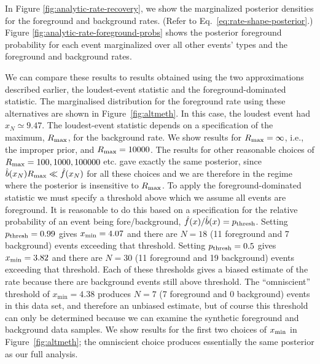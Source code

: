 \documentclass[aps,prd]{revtex4-1}
\begin{document}
In Figure \ref{fig:analytic-rate-recovery}, we show the marginalized
posterior densities for the foreground and background rates.  (Refer
to Eq.~\eqref{eq:rate-shape-posterior}.)  Figure
\ref{fig:analytic-rate-foreground-probs} shows the posterior
foreground probability for each event marginalized over all other
events' types and the foreground and background rates.

We can compare these results to results obtained using the two
approximations described earlier, the loudest-event statistic and the
foreground-dominated statistic. The marginalised distribution for the
foreground rate using these alternatives are shown in
Figure~\ref{fig:altmeth}. In this case, the loudest event had
$x_N\simeq 9.47$. The loudest-event statistic depends on a
specification of the maximum, $R_{\rm max}$, for the background
rate. We show results for $R_{\rm max}=\infty$, i.e., the improper
prior, and $R_{\rm max}=10000$. The results for other reasonable
choices of $R_{\rm max} = 100, 1000, 100000$ etc. gave exactly the
same posterior, since $\hat{b}(x_N) R_{\rm max} \ll \hat{f}(x_N)$ for
all these choices and we are therefore in the regime where the
posterior is insensitive to $R_{\rm max}$. To apply the
foreground-dominated statistic we must specify a threshold above which
we assume all events are foreground. It is reasonable to do this based
on a specification for the relative probability of an event being
fore/background, $\hat{f}(x)/\hat{b}(x)=p_{\rm thresh}$. Setting
$p_{\rm thresh}=0.99$ gives $x_{\rm min}=4.07$ and there are $N=18$
(11 foreground and 7 background) events exceeding that
threshold. Setting $p_{\rm thresh}=0.5$ gives $x_{\rm min}=3.82$ and
there are $N=30$ (11 foreground and 19 background) events exceeding
that threshold.  Each of these thresholds gives a biased estimate of
the rate because there are background events still above threshold.
The ``omniscient'' threshold of $x_\mathrm{min} = 4.38$ produces $N=7$
(7 foreground and 0 background) events in this data set, and therefore
an unbiased estimate, but of course this threshold can only be
determined because we can examine the synthetic foreground and
background data samples.  We show results for the first two choices of
$x_{\rm min}$ in Figure~\ref{fig:altmeth}; the omniscient choice
produces essentially the same posterior as our full analysis.
\end{document}
